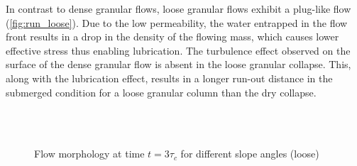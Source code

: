 In contrast to dense granular flows, loose granular flows exhibit a plug-like 
flow (\cref{fig:run_loose}). Due to the low permeability, the 
water entrapped in the flow front results in a drop in the density of the 
flowing mass, which causes lower effective stress thus enabling lubrication. 
The turbulence effect observed on the surface of the dense granular flow is 
absent in the loose granular collapse. This, along with the lubrication effect, 
results in a longer run-out distance in the submerged condition for a loose 
granular column than the dry collapse. 

\begin{figure}
\\

\\

\caption{Flow morphology at time $t = 3\tau_c$ for different slope angles 
(loose)}
\label{fig:slope_loose}
\end{figure}


